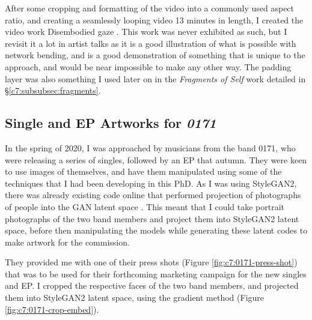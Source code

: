After some cropping and formatting of the video into a commonly used aspect ratio, and creating a seamlessly looping video 13 minutes in length, I created the video work Disembodied gaze \citep{broad2020disembodied}. 
This work was never exhibited as such, but I revisit it a lot in artist talks as it is a good illustration of what is possible with network bending, and is a good demonstration of something that is unique to the approach, and would be near impossible to make any other way. 
The padding layer was also something I used later on in the \textit{Fragments of Self} work detailed in \S \ref{c7:subsubsec:fragments}.

\subsection{Single and EP Artworks for \textit{0171}}
\label{c7:subsubsec:0171}

In the spring of 2020, I was approached by musicians from the band 0171, who were releasing a series of singles, followed by an EP that autumn. 
They were keen to use images of themselves, and have them manipulated using some of the techniques that I had been developing in this PhD.
As I was using StyleGAN2, there was already existing code online that performed projection of photographs of people into the GAN latent space \citep{abdal2019image2stylegan}.
This meant that I could take portrait photographs of the two band members and project them into StyleGAN2 latent space, before then manipulating the models while generating these latent codes to make artwork for the commission. 

They provided me with one of their press shots (Figure \ref{fig:c7:0171-press-shot})  that was to be used for their forthcoming marketing campaign for the new singles and EP. 
I cropped the respective faces of the two band members, and projected them into StyleGAN2 latent space, using the gradient method \citep{abdal2019image2stylegan} (Figure \ref{fig:c7:0171-crop-embed}).

